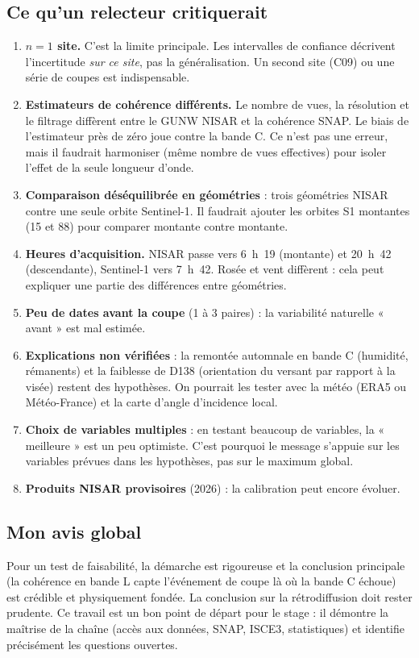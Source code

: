 \documentclass[11pt,a4paper]{article}
\begin{document}
\subsection{Ce qu'un relecteur critiquerait}
\begin{enumerate}
\item \textbf{$n=1$ site.} C'est la limite principale. Les intervalles de confiance décrivent l'incertitude
  \emph{sur ce site}, pas la généralisation. Un second site (C09) ou une série de coupes est indispensable.
\item \textbf{Estimateurs de cohérence différents.} Le nombre de vues, la résolution et le filtrage diffèrent entre
  le GUNW NISAR et la cohérence SNAP. Le biais de l'estimateur près de zéro joue contre la bande C. Ce n'est pas une
  erreur, mais il faudrait harmoniser (même nombre de vues effectives) pour isoler l'effet de la seule longueur
  d'onde.
\item \textbf{Comparaison déséquilibrée en géométries} : trois géométries NISAR contre une seule orbite
  Sentinel-1. Il faudrait ajouter les orbites S1 montantes (15 et 88) pour comparer montante contre montante.
\item \textbf{Heures d'acquisition.} NISAR passe vers 6~h~19 (montante) et 20~h~42 (descendante), Sentinel-1 vers
  7~h~42. Rosée et vent diffèrent : cela peut expliquer une partie des différences entre géométries.
\item \textbf{Peu de dates avant la coupe} (1 à 3 paires) : la variabilité naturelle « avant » est mal estimée.
\item \textbf{Explications non vérifiées} : la remontée automnale en bande C (humidité, rémanents) et la faiblesse
  de D138 (orientation du versant par rapport à la visée) restent des hypothèses. On pourrait les tester avec la
  météo (ERA5 ou Météo-France) et la carte d'angle d'incidence local.
\item \textbf{Choix de variables multiples} : en testant beaucoup de variables, la « meilleure » est un peu
  optimiste. C'est pourquoi le message s'appuie sur les variables prévues dans les hypothèses, pas sur le maximum
  global.
\item \textbf{Produits NISAR provisoires} (2026) : la calibration peut encore évoluer.
\end{enumerate}

\subsection{Mon avis global}
Pour un test de faisabilité, la démarche est rigoureuse et la conclusion principale (la cohérence en bande L capte
l'événement de coupe là où la bande C échoue) est crédible et physiquement fondée. La conclusion sur la
rétrodiffusion doit rester prudente. Ce travail est un bon point de départ pour le stage : il démontre la maîtrise
de la chaîne (accès aux données, SNAP, ISCE3, statistiques) et identifie précisément les questions ouvertes.
\end{document}
